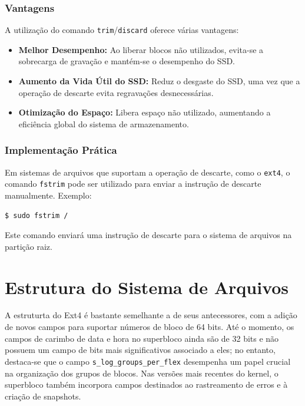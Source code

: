 \documentclass[
	12pt,				%
	openright,			%
	oneside,			%
	a4paper,			%
	chapter=TITLE,		%
	english,			%
	french,				%
	spanish,			%
	brazil				%
	]{abntex2}
\theoremstyle{definition}
\begin{document}
\subsection{Vantagens}
A utilização do comando \texttt{trim}/\texttt{discard} oferece várias vantagens:

\begin{itemize}
    \item \textbf{Melhor Desempenho:} Ao liberar blocos não utilizados, evita-se a sobrecarga de gravação e mantém-se o desempenho do SSD.
    
    \item \textbf{Aumento da Vida Útil do SSD:} Reduz o desgaste do SSD, uma vez que a operação de descarte evita regravações desnecessárias.
    
    \item \textbf{Otimização do Espaço:} Libera espaço não utilizado, aumentando a eficiência global do sistema de armazenamento.
\end{itemize}

\subsection{Implementação Prática}
Em sistemas de arquivos que suportam a operação de descarte, como o \texttt{ext4}, o comando \texttt{fstrim} pode ser utilizado para enviar a instrução de descarte manualmente. Exemplo:

\begin{lstlisting}[language=bash, caption={Exemplo de Utilização do \texttt{fstrim}}]
$ sudo fstrim /
\end{lstlisting}

Este comando enviará uma instrução de descarte para o sistema de arquivos na partição raiz.


\chapter{Estrutura do Sistema de Arquivos}

A estruturta do Ext4 é bastante semelhante a de seus antecessores, com a adição de novos campos para 
suportar números de bloco de 64 bits. Até o momento, os campos de carimbo de data e hora no superbloco 
ainda são de 32 bits e não possuem um campo de bits mais significativos associado a eles; no entanto, 
destaca-se que o campo \texttt{s\_log\_groups\_per\_flex} desempenha um papel crucial na organização 
dos grupos de blocos. Nas versões mais recentes do kernel, o superbloco também incorpora campos 
destinados ao rastreamento de erros e à criação de snapshots.
\end{document}
